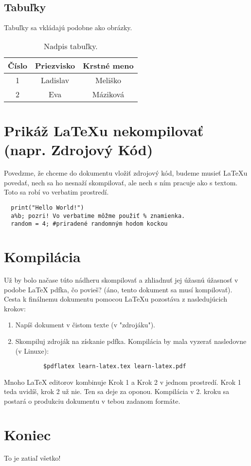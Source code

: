 \documentclass[12pt]{article}
\begin{document}
\subsection{Tabuľky}
Tabuľky sa vkládajú podobne ako obrázky.

\begin{table}[H]
  \caption{Nadpis tabuľky.}
  \begin{tabular}{c|cc} 
    Číslo & Priezvisko & Krstné meno \\ %
    \hline %
    1 & Ladislav & Meliško \\
    2 & Eva & Máziková
  \end{tabular}
\end{table}


\section{Prikáž LaTeXu nekompilovať (napr. Zdrojový Kód)}
Povedzme, že chceme do dokumentu vložiť zdrojový kód, budeme musieť LaTeXu povedať, nech sa ho nesnaží skompilovať, ale nech s ním pracuje ako s textom.
Toto sa robí vo verbatim prostredí. 

\begin{verbatim} 
  print("Hello World!")
  a%b; pozri! Vo verbatime môžme použiť % znamienka. 
  random = 4; #priradené randomným hodom kockou
\end{verbatim}

\section{Kompilácia} 

Už by bolo načase túto nádheru skompilovať a zhliadnuť jej úžasnú úžasnosť v podobe LaTeX pdfka, čo povieš?
(áno, tento dokument sa musí kompilovať). \\
Cesta k finálnemu dokumentu pomocou LaTeXu pozostáva z nasledujúcich krokov:
  \begin{enumerate}
    \item Napíš dokument v čistom texte (v "zdrojáku").
    \item Skompiluj zdroják na získanie pdfka. 
     Kompilácia by mala vyzerať nasledovne (v Linuxe): \\
     \begin{verbatim} 
        $pdflatex learn-latex.tex learn-latex.pdf 
     \end{verbatim}
  \end{enumerate}

Mnoho LaTeX editorov kombinuje Krok 1 a Krok 2 v jednom prostredí. Krok 1 teda uvidíš, krok 2 už nie.
Ten sa deje za oponou. Kompilácia v 2. kroku sa postará o produkciu dokumentu v tebou zadanom formáte.

\section{Koniec}

To je zatiaľ všetko!

\end{document}

